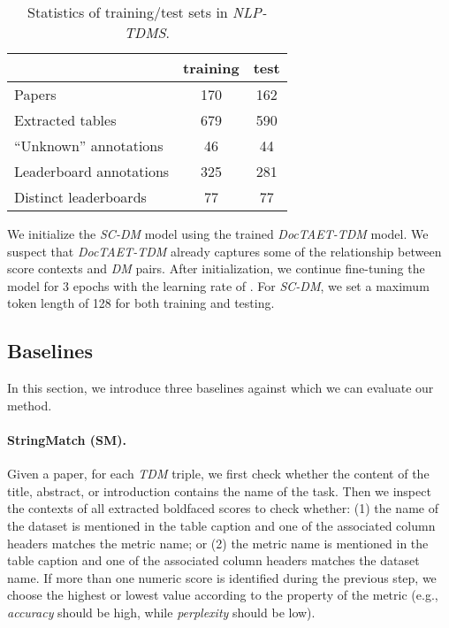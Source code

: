 \documentclass[11pt,a4paper]{article}
\begin{document}
\begin{table}[t]
\begin{center}
\begin{tabular}{@{}lcc@{}}
&training&test\\ \hline
Papers   &170&162\\ Extracted tables   &679&590\\ ``Unknown'' annotations &46&44\\ \hline
Leaderboard annotations &  325&281\\
\enspace\enspace Distinct leaderboards& 77&77\\
 \hline
\end{tabular}
\end{center}
\caption{\label{tab:exp1stat}  Statistics of training/test sets in \emph{NLP-TDMS}.}
\end{table}

We initialize the \emph{SC-DM} model using the trained \emph{DocTAET-TDM} model.
We suspect that 
\emph{DocTAET-TDM} already captures some of the relationship between score contexts and \emph{DM} pairs. After initialization, we continue
fine-tuning the model for 3 epochs with the learning rate of .
For \emph{SC-DM}, we set a maximum token length of 128 for both training and testing.

\subsection{Baselines}\label{sec:baselines}
In this section, we introduce three baselines against which we can evaluate our method. 

\paragraph{StringMatch (SM).} 
Given a paper, for
each \emph{TDM} triple, we first check whether the content of the title, abstract, or introduction contains the name of the task. Then we inspect the contexts of all extracted boldfaced scores to check whether: (1) the name of the dataset is mentioned in the table caption and one of the associated column headers matches the metric name; or (2) the metric name is mentioned in the table caption and one of the associated column headers matches the dataset name. If more than one numeric score is identified during the previous step, we choose the highest or lowest value according to the property of the metric (e.g., \emph{accuracy} should be high, while \emph{perplexity} should be low).
\end{document}
